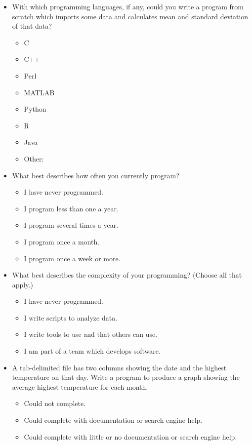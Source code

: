 \documentclass[10pt,a4paper,twocolumn]{article}
\begin{document}
\begin{itemize}
\item
  With which programming languages, if any, could you write a program
  from scratch which imports some data and calculates mean and
  standard deviation of that data?
  \begin{itemize}[noitemsep]
    \item C
    \item C++
    \item Perl
    \item MATLAB
    \item Python
    \item R
    \item Java
    \item Other:
  \end{itemize}

\item
  What best describes how often you currently program?
  \begin{itemize}[noitemsep]
    \item I have never programmed.
    \item I program less than one a year.
    \item I program several times a year.
    \item I program once a month.
    \item I program once a week or more.
  \end{itemize}

\item
  What best describes the complexity of your programming? (Choose all
  that apply.)
  \begin{itemize}[noitemsep]
    \item I have never programmed.
    \item I write scripts to analyze data.
    \item I write tools to use and that others can use.
    \item I am part of a team which develops software.
  \end{itemize}

  \item
    A tab-delimited file has two columns showing the date and the
    highest temperature on that day. Write a program to produce a
    graph showing the average highest temperature for each month.
    \begin{itemize}[noitemsep]
    \item Could not complete.
    \item Could complete with documentation or search engine help.
    \item Could complete with little or no documentation or search engine help.
    \end{itemize}


\end{itemize}
\end{document}
